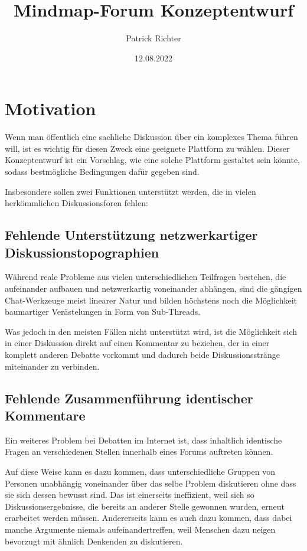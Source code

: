 \documentclass{article}
\title{Mindmap-Forum Konzeptentwurf}
\date{12.08.2022}
\author{Patrick Richter}
\begin{document}
	
	\maketitle
	\tableofcontents
	\newpage
	
	\setlength{\parindent}{0cm}
	
	\section{Motivation}
	
	Wenn man öffentlich eine sachliche Diskussion über ein komplexes Thema führen will, ist es wichtig für diesen Zweck eine geeignete Plattform zu wählen. Dieser Konzeptentwurf ist ein Vorschlag, wie eine solche Plattform gestaltet sein könnte, sodass bestmögliche Bedingungen dafür gegeben sind.
	
	\bigskip
	Insbesondere sollen zwei Funktionen unterstützt werden, die in vielen herkömmlichen Diskussionsforen fehlen:
	
	\subsection{Fehlende Unterstützung netzwerkartiger Diskussionstopographien}
	
	Während reale Probleme aus vielen unterschiedlichen Teilfragen bestehen, die aufeinander aufbauen und netzwerkartig voneinander abhängen, sind die gängigen Chat-Werkzeuge meist linearer Natur und bilden höchstens noch die Möglichkeit baumartiger Verästelungen in Form von Sub-Threads.
	
	\bigskip
	Was jedoch in den meisten Fällen nicht unterstützt wird, ist die Möglichkeit sich in einer Diskussion direkt auf einen Kommentar zu beziehen, der in einer komplett anderen Debatte vorkommt und dadurch beide Diskussionsstränge miteinander zu verbinden.
	
	\subsection{Fehlende Zusammenführung identischer Kommentare}
	
	\bigskip
	Ein weiteres Problem bei Debatten im Internet ist, dass inhaltlich identische Fragen an verschiedenen Stellen innerhalb eines Forums auftreten können.
	
	\bigskip
	Auf diese Weise kann es dazu kommen, dass unterschiedliche Gruppen von Personen unabhängig voneinander über das selbe Problem diskutieren ohne dass sie sich dessen bewusst sind. Das ist einerseits ineffizient, weil sich so Diskussionsergebnisse, die bereits an anderer Stelle gewonnen wurden, erneut erarbeitet werden müssen. Andererseits kann es auch dazu kommen, dass dabei manche Argumente niemals aufeinandertreffen, weil Menschen dazu neigen bevorzugt mit ähnlich Denkenden zu diskutieren.
	
\end{document}
